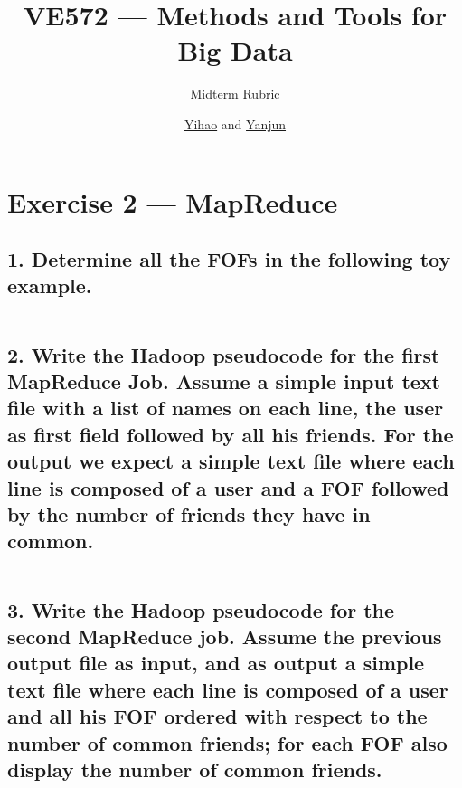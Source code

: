 \documentclass[11pt,a4paper]{article}
\title{VE572 --- Methods and Tools for Big Data}
\subtitle{Midterm Rubric}
\author{\href{mailto:liuyh615@sjtu.edu.cn}{Yihao} and \href{mailto:AuroraZYJ@sjtu.edu.cn}{Yanjun}}
\begin{document}
\maketitle

\section*{Exercise 2 --- MapReduce}

\subsection*{1. Determine all the FOFs in the following toy example.}

\inputminted{shell}{../data.txt}

\subsection*{2. Write the Hadoop pseudocode
for the first MapReduce Job. Assume a simple input text file
with a list of names on each line, the user as first field followed by all his friends. For the
output we expect a simple text file where each line is composed of a user and a FOF followed
by the number of friends they have in common.}

\inputminted{java}{../src/main/java/com/ve572/e1/FindFOF.java}

\subsection*{3. Write the Hadoop pseudocode
for the second MapReduce job. Assume the previous output
file as input, and as output a simple text file where each line is composed of a user and all his
FOF ordered with respect to the number of common friends; for each FOF also display the
number of common friends.}


\inputminted{java}{../src/main/java/com/ve572/e1/CountFOF.java}
\end{document}
